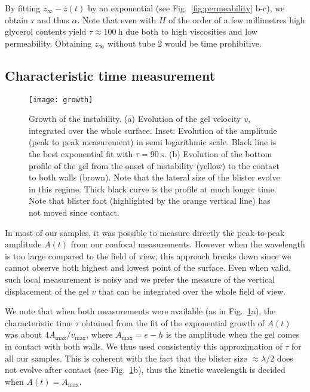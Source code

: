 \documentclass[twocolumn,superscriptaddress,showpacs,preprintnumbers,amsmath,amssymb,prl]{revtex4-1}
\begin{document}
By fitting $z_\infty-z(t)$ by an exponential (see Fig.~\ref{fig:permeability} b-c), we obtain $\tau$ and thus $\alpha$. Note that even with $H$ of the order of a few millimetres high glycerol contents yield $\tau\approx \SI{100}{\hour}$ due both to high viscosities and low permeability. Obtaining $z_\infty$ without tube 2 would be time prohibitive.

\subsection*{Characteristic time measurement}
\begin{figure}
	\texttt{[image: growth]}
	\caption{Growth of the instability. (a) Evolution of the gel velocity $v$, integrated over the whole surface. Inset: Evolution of the amplitude (peak to peak measurement) in semi logarithmic scale. Black line is the best exponential fit with $\tau=\SI{90}{\second}$. (b) Evolution of the bottom profile of the gel from the onset of instability (yellow) to the contact to both walls (brown). Note that the lateral size of the blister evolve in this regime. Thick black curve is the profile at much longer time. Note that blister foot (highlighted by the orange vertical line) has not moved since contact.}
	\label{fig:growth}
\end{figure}

In most of our samples, it was possible to measure directly the peak-to-peak amplitude $A(t)$ from our confocal measurements. However when the wavelength is too large compared to the field of view, this approach breaks down since we cannot observe both highest and lowest point of the surface. Even when valid, such local measurement is noisy and we prefer the measure of the vertical displacement of the gel $v$ that can be integrated over the whole field of view.

We note that when both measurements were available (as in Fig.~\ref{fig:growth}a), the characteristic time $\tau$ obtained from the fit of the exponential growth of $A(t)$ was about $4A_\text{max}/v_\text{max}$, where $A_\text{max} = e-h$ is the amplitude when the gel comes in contact with both walls. We thus used consistently this approximation of $\tau$ for all our samples. This is coherent with the fact that the blister size $\approx\lambda/2$ does not evolve after contact (see Fig.~\ref{fig:growth}b), thus the kinetic wavelength is decided when $A(t) = A_\text{max}$.
\end{document}
